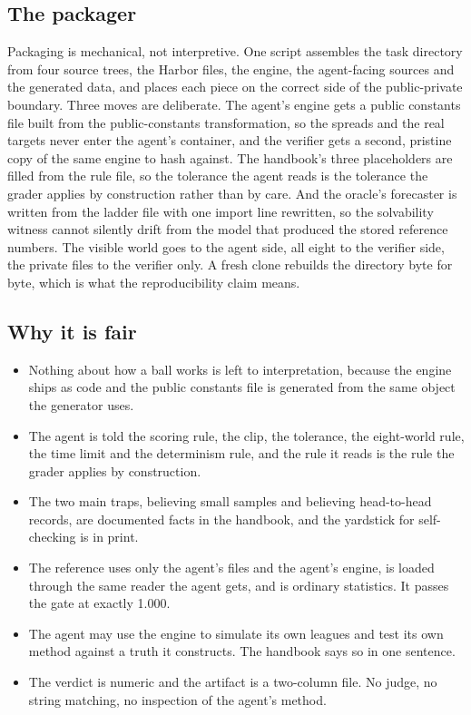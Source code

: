 \documentclass[11pt,letterpaper]{article}
\begin{document}
\subsection{The packager}

Packaging is mechanical, not interpretive. One script assembles the task directory from four source trees, the Harbor files, the engine, the agent-facing sources and the generated data, and places each piece on the correct side of the public-private boundary. Three moves are deliberate. The agent's engine gets a public constants file built from the public-constants transformation, so the spreads and the real targets never enter the agent's container, and the verifier gets a second, pristine copy of the same engine to hash against. The handbook's three placeholders are filled from the rule file, so the tolerance the agent reads is the tolerance the grader applies by construction rather than by care. And the oracle's forecaster is written from the ladder file with one import line rewritten, so the solvability witness cannot silently drift from the model that produced the stored reference numbers. The visible world goes to the agent side, all eight to the verifier side, the private files to the verifier only. A fresh clone rebuilds the directory byte for byte, which is what the reproducibility claim means.


\subsection{Why it is fair}

\begin{itemize}[leftmargin=1.4em, itemsep=2pt]
\item Nothing about how a ball works is left to interpretation, because the engine ships as code and the public constants file is generated from the same object the generator uses.
\item The agent is told the scoring rule, the clip, the tolerance, the eight-world rule, the time limit and the determinism rule, and the rule it reads is the rule the grader applies by construction.
\item The two main traps, believing small samples and believing head-to-head records, are documented facts in the handbook, and the yardstick for self-checking is in print.
\item The reference uses only the agent's files and the agent's engine, is loaded through the same reader the agent gets, and is ordinary statistics. It passes the gate at exactly 1.000.
\item The agent may use the engine to simulate its own leagues and test its own method against a truth it constructs. The handbook says so in one sentence.
\item The verdict is numeric and the artifact is a two-column file. No judge, no string matching, no inspection of the agent's method.
\end{itemize}
\end{document}
